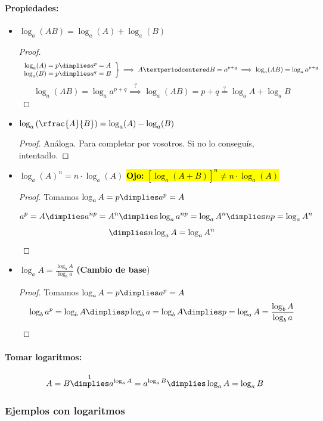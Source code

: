 \paragraph{Propiedades:}
\begin{itemize}
	\item $\log_a(AB) = \log_a(A) + \log_a(B)$
		\begin{proof}
			\[\left.\begin{array}{c}
				\log_a(A) = p \dimplies a^p = A\\
				\log_a(B) = p \dimplies a^q = B
			\end{array}\right\}\implies A·B = a^{p+q} \implies \log_a(AB) = \log_aa^{p+q}\]
			\[
				\log_a(AB) = \log_aa^{p+q} \overset{?}{\implies} \log_a(AB) = p+q \overset{?}{=} \log_aA + \log_aB
			\]
		\end{proof}
	\item $\log_a\left(\rfrac{A}{B}\right) = \log_a(A) - \log_a(B)$
	\begin{proof}
		Análoga. Para completar por vosotros. Si no lo conseguís, intentadlo.
	\end{proof}
	\item $\log_a(A)^n = n·\log_a(A)$ \hl{\textbf{Ojo:} $\left[\log_a(A+B)\right]^n \neq n·\log_a(A)$}
	\begin{proof}
		Tomamos $\log_aA = p \dimplies a^p = A$

		\[
			a^p = A \dimplies a^{np}=A^n \dimplies \log_aa^{np} = \log_aA^n \dimplies np = \log_aA^n
		\]
		\[ 
			\dimplies n\log_aA = \log_aA^n
		\]
	\end{proof}
	\item $\displaystyle\log_aA = \frac{\log_bA}{\log_ba}$ \textbf{(Cambio de base})
		\begin{proof}
			Tomamos $\log_aA = p \dimplies a^p = A$
			\[
				\log_ba^p = \log_bA \dimplies p\log_ba = \log_bA \dimplies p=\log_aA=\frac{\log_bA}{\log_ba}
			\]

		\end{proof}
\end{itemize}

\paragraph{Tomar logaritmos:}

\[
A = B \overset{1}{\dimplies} a^{\log_a A} = a^{\log_a B} \dimplies \log_aA=\log_aB
\]

\subsubsection{Ejemplos con logaritmos}

